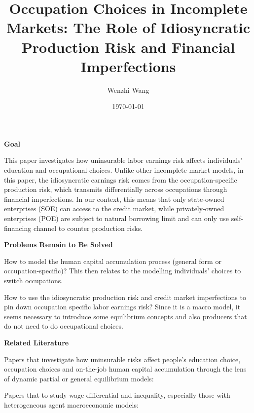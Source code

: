 \documentclass[12pt]{article}
\theoremstyle{definition}
\begin{document}
\title{\bf {Occupation Choices in Incomplete Markets: The Role of Idiosyncratic Production Risk and Financial Imperfections}} 
\author{Wenzhi Wang} 
\date{\today}
\maketitle

\begin{spacing}{1}

{\noindent \bf Goal}

This paper investigates how uninsurable labor earnings risk affects individuals' education and occupational choices. Unlike other incomplete market models, in this paper, the idiosyncratic earnings risk comes from the occupation-specific production risk, which transmits differentially across occupations through financial imperfections. In our context, this means that only state-owned enterprises (SOE) can access to the credit market, while privately-owned enterprises (POE) are subject to natural borrowing limit and can only use self-financing channel to counter production risks.

{\noindent \bf Problems Remain to Be Solved}

How to model the human capital accumulation process (general form or occupation-specific)? This then relates to the modelling individuals' choices to switch occupations.

How to use the idiosyncratic production risk and credit market imperfections to pin down occupation specific labor earnings risk? Since it is a macro model, it seems necessary to introduce some equilibrium concepts and also producers that do not need to do occupational choices.

{\noindent \bf Related Literature}

Papers that investigate how uninsurable risks affect people's education choice, occupation choices and on-the-job human capital accumulation through the lens of dynamic partial or general equilibrium models: 
\citet{kambourov2008, dillon2018, hawkins2012, silos2015, cubas2020, dvorkin2019, mestieri2017, sullivan2010, todd2020, cubas2023, singh2010, krebs2003, park2018, huggett2011, stantcheva2017, he2008, restuccia2013a}

Papers that to study wage differential and inequality, especially those with heterogeneous agent macroeconomic models: \citet{neumuller2015, cubas2017, heckman1998}


\end{spacing}
\end{document}
